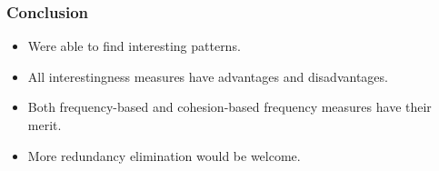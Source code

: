 \documentclass[dvipsnames]{beamer}
\begin{document}
\begin{frame}
\frametitle{Conclusion}

\begin{itemize}
\item<1-> Were able to find interesting patterns.
\item<2-> All interestingness measures have advantages and disadvantages.
\item<3-> Both frequency-based and cohesion-based frequency measures have their merit.
\item<4-> More redundancy elimination would be welcome.
\end{itemize}

\end{frame}
\end{document}
